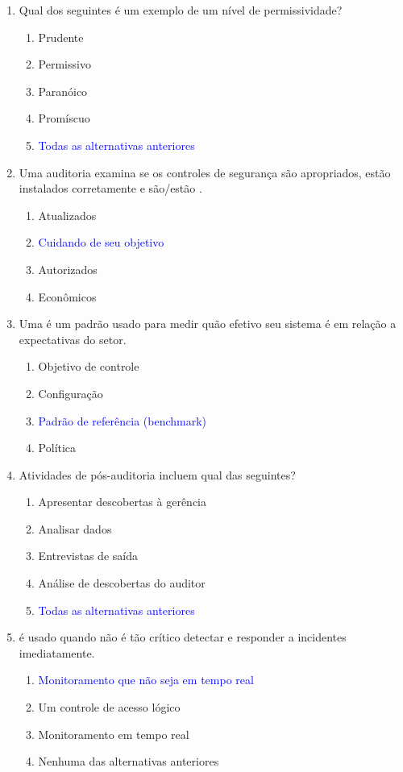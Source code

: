\documentclass{report}
\begin{document}
	\begin{enumerate}
		\item Qual dos seguintes é um exemplo de um nível de permissividade?
		\begin{enumerate}[label=(\alph*)]
			\item Prudente
			\item Permissivo
			\item Paranóico
			\item Promíscuo
			\item \textcolor{blue}{Todas as alternativas anteriores}
		\end{enumerate}
		
		\item Uma auditoria examina se os controles de segurança são apropriados, estão instalados corretamente e são/estão .
		\begin{enumerate}[label=(\alph*)]
			\item Atualizados
			\item \textcolor{blue}{Cuidando de seu objetivo}
			\item Autorizados
			\item Econômicos
		\end{enumerate}
		
		\item Uma é um padrão usado para medir quão efetivo seu sistema é em relação a expectativas do setor.
		\begin{enumerate}[label=(\alph*)]
			\item Objetivo de controle
			\item Configuração
			\item \textcolor{blue}{Padrão de referência (benchmark)}
			\item Política
		\end{enumerate}
		
		\item Atividades de pós-auditoria incluem qual das seguintes?
		\begin{enumerate}[label=(\alph*)]
			\item Apresentar descobertas à gerência
			\item Analisar dados
			\item Entrevistas de saída
			\item Análise de descobertas do auditor
			\item \textcolor{blue}{Todas as alternativas anteriores}
		\end{enumerate}
		
		\item é usado quando não é tão crítico detectar e responder a incidentes imediatamente.
		\begin{enumerate}[label=(\alph*)]
			\item \textcolor{blue}{Monitoramento que não seja em tempo real}
			\item Um controle de acesso lógico
			\item Monitoramento em tempo real
			\item Nenhuma das alternativas anteriores
		\end{enumerate}
		

\end{enumerate}
\end{document}
